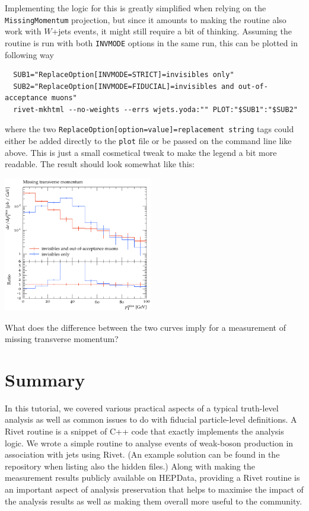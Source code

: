 \documentclass[10pt,fleqn]{scrartcl}
\theoremstyle{exstyle}
\begin{document}
Implementing the logic for this is greatly simplified when relying on
the \verb|MissingMomentum| projection, but since it amounts to
making the routine also work with $W$+jets events, 
it might still require a bit of thinking. 
Assuming the routine is run with both \verb|INVMODE| options
in the same run, this can be plotted in following way
\begin{verbatim}
  SUB1="ReplaceOption[INVMODE=STRICT]=invisibles only"
  SUB2="ReplaceOption[INVMODE=FIDUCIAL]=invisibles and out-of-acceptance muons"
  rivet-mkhtml --no-weights --errs wjets.yoda:"" PLOT:"$SUB1":"$SUB2"
\end{verbatim}
where the two \verb|ReplaceOption[option=value]=replacement string| tags could 
either be added directly to the \verb|plot| file or be passed on the command line like above. 
This is just a small cosmetical tweak to make the legend a bit more readable.
The result should look somewhat like this:

\begin{center}
\includegraphics[width=0.49\textwidth]{figures/pTmiss.pdf}
\end{center}

What does the difference between the two curves imply
for a measurement of missing transverse momentum?

\section{Summary}

In this tutorial, we covered various practical aspects of a typical truth-level analysis
as well as common issues to do with fiducial particle-level definitions.
A Rivet routine is a snippet of C++ code that exactly implements the analysis logic.
We wrote a simple routine to analyse events of weak-boson production in association
with jets using Rivet. 
(An example solution can be found in the repository when listing also the hidden files.)
Along with making the measurement results publicly available on HEPData,
providing a Rivet routine is an important aspect of analysis preservation
that helps to maximise the impact of the analysis results as well as
making them overall more useful to the community.
\end{document}
